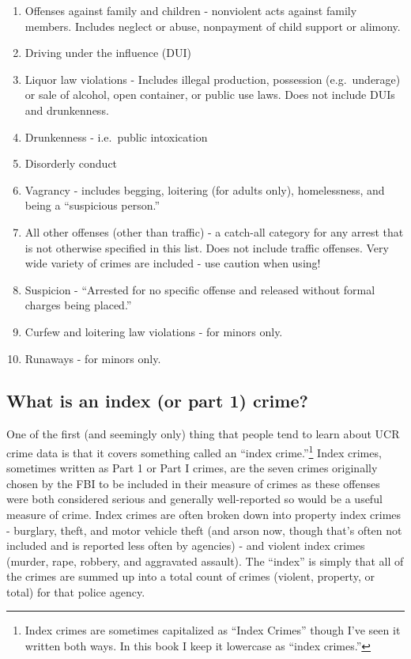 \documentclass[
  12pt,
  openany]{book}
\providecommand{\tightlist}{%
  \setlength{\itemsep}{0pt}\setlength{\parskip}{0pt}}
\begin{document}
\begin{enumerate}
\def\labelenumi{\arabic{enumi}.}
\setcounter{enumi}{19}
\tightlist
\item
  Offenses against family and children - nonviolent acts against family members. Includes neglect or abuse, nonpayment of child support or alimony.
\item
  Driving under the influence (DUI)
\item
  Liquor law violations - Includes illegal production, possession (e.g.~underage) or sale of alcohol, open container, or public use laws. Does not include DUIs and drunkenness.
\item
  Drunkenness - i.e.~public intoxication
\item
  Disorderly conduct
\item
  Vagrancy - includes begging, loitering (for adults only), homelessness, and being a ``suspicious person.''
\item
  All other offenses (other than traffic) - a catch-all category for any arrest that is not otherwise specified in this list. Does not include traffic offenses. Very wide variety of crimes are included - use caution when using!
\item
  Suspicion - ``Arrested for no specific offense and released without formal charges being placed.''
\item
  Curfew and loitering law violations - for minors only.
\item
  Runaways - for minors only.
\end{enumerate}

\hypertarget{indexCrimes}{%
\subsection{What is an index (or part 1) crime?}\label{indexCrimes}}

One of the first (and seemingly only) thing that people tend to learn about UCR crime data is that it covers something called an ``index crime.''\footnote{Index crimes are sometimes capitalized as ``Index Crimes'' though I've seen it written both ways. In this book I keep it lowercase as ``index crimes.''} Index crimes, sometimes written as Part 1 or Part I crimes, are the seven crimes originally chosen by the FBI to be included in their measure of crimes as these offenses were both considered serious and generally well-reported so would be a useful measure of crime. Index crimes are often broken down into property index crimes - burglary, theft, and motor vehicle theft (and arson now, though that's often not included and is reported less often by agencies) - and violent index crimes (murder, rape, robbery, and aggravated assault). The ``index'' is simply that all of the crimes are summed up into a total count of crimes (violent, property, or total) for that police agency.
\end{document}

